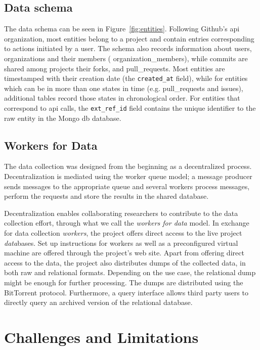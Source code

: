 \documentclass[conference]{IEEEtran}
\begin{document}
\subsection*{Data schema}

The data schema can be seen in Figure~\ref{fig:entities}. Following Github's
{\sc api} organization, most entities belong to a {\sf project} and contain
entries corresponding to actions initiated by a {\sf user}. The schema also
records information about {\sf users}, organizations and their members ({\sf
organization\_members}), while {\sf commits} are shared among {\sf projects} their
forks, and {\sf pull\_requests}.  Most entities are timestamped with their
creation date (the \texttt{created\_at} field), while for entities which can be
in more than one states in time (e.g.  {\sf pull\_requests} and {\sf issues}),
additional tables record those states in chronological order.  
For entities that correspond to {\sc api} calls, the \texttt{ext\_ref\_id}
field contains the unique identifier to the raw entity in the Mongo{\sc
db} database.

\subsection*{Workers for Data}

The data collection was designed from the beginning as a decentralized process.
Decentralization is mediated using the worker queue model; a message producer
sends messages to the appropriate queue and several workers process messages,
perform the requests and store the results in the shared database.

Decentralization enables collaborating researchers to contribute to the data
collection effort, through what we call the \emph{workers for data} model.  In
exchange for data collection \emph{workers}, the project offers direct access to
the live project \emph{data}bases. Set up instructions for workers as well as a
preconfigured virtual machine are offered through the project's web site. Apart
from offering direct access to the data, the project also distributes dumps of
the collected data, in both raw and relational formats. Depending on the use
case, the relational dump might be enough for further processing. The dumps are
distributed using the BitTorrent protocol. Furthermore, a query interface
allows third party users to directly query an archived version of the relational
database.

\section{Challenges and Limitations}
\end{document}
